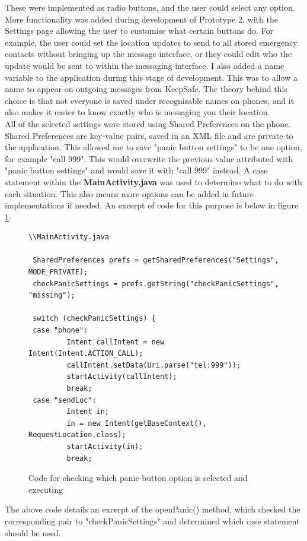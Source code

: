 \documentclass[a4paper]{report}
\begin{document}
These were implemented as radio buttons, and the user could select any option.\\
More functionality was added during development of Prototype 2, with the Settings page allowing the user to customise what certain buttons do. For example, the user could set the location updates to send to all stored emergency contacts without bringing up the message interface, or they could edit who the update would be sent to within the messaging interface. I also added a name variable to the application during this stage of development. This was to allow a name to appear on outgoing messages from KeepSafe. The theory behind this choice is that not everyone is saved under recognisable names on phones, and it also makes it easier to know exactly who is messaging you their location. \\ All of the selected settings were stored using Shared Preferences on the phone. Shared Preferences are key-value pairs, saved in an XML file and are private to the application. This allowed me to save "panic button settings" to be one option, for example "call 999". This would overwrite the previous value attributed with "panic button settings" and would save it with "call 999" instead. A case statement within the \textbf{MainActivity.java} was used to determine what to do with each situation. This also means more options can be added in future implementations if needed.  
An excerpt of code for this purpose is below in figure \ref{fig:panicSettings}:\\
\begin{figure}[H]
\singlespacing
\begin{lstlisting}
\\MainActivity.java

 SharedPreferences prefs = getSharedPreferences("Settings", MODE_PRIVATE);
 checkPanicSettings = prefs.getString("checkPanicSettings", "missing");

 switch (checkPanicSettings) {
 case "phone":
		 Intent callIntent = new Intent(Intent.ACTION_CALL);
		 callIntent.setData(Uri.parse("tel:999"));
		 startActivity(callIntent);
		 break;
 case "sendLoc":
		 Intent in;
		 in = new Intent(getBaseContext(), RequestLocation.class);
		 startActivity(in);
		 break;
\end{lstlisting}
\caption{Code for checking which panic button option is selected and executing}
	\label{fig:panicSettings}
\end{figure} 
The above code details an excerpt of the openPanic() method, which checked the corresponding pair to "checkPanicSettings" and determined which case statement should be used. 
\end{document}
